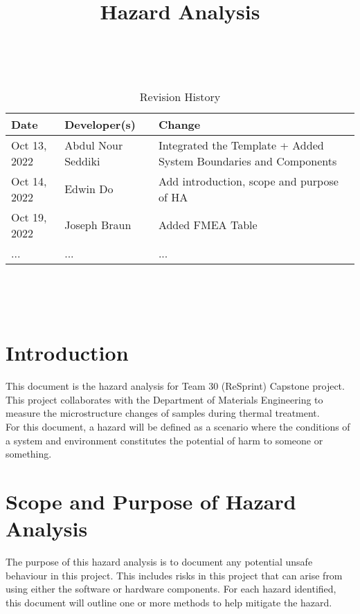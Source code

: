 \documentclass{article}
\title{Hazard Analysis\\\progname}
\author{\authname}
\date{}
\begin{document}
\maketitle
\thispagestyle{empty}

~\newpage


\begin{table}[hp]
\caption{Revision History} \label{TblRevisionHistory}
\begin{tabularx}{\textwidth}{llX}
\toprule
\textbf{Date} & \textbf{Developer(s)} & \textbf{Change}\\
\midrule
Oct 13, 2022 & Abdul Nour Seddiki & Integrated the Template + Added System Boundaries and Components\\
Oct 14, 2022 & Edwin Do & Add introduction, scope and purpose of HA \\
Oct 19, 2022 & Joseph Braun & Added FMEA Table\\
... & ... & ...\\
\bottomrule
\end{tabularx}
\end{table}

~\newpage

\tableofcontents

~\newpage



\section{Introduction}
This document is the hazard analysis for Team 30 (ReSprint) Capstone project. 
This project collaborates with the Department of Materials Engineering to measure the microstructure changes of samples during thermal treatment.\\

\noindent For this document, a hazard will be defined as 
a scenario where the conditions of a system and environment constitutes the potential of harm to someone or something.

\section{Scope and Purpose of Hazard Analysis}
The purpose of this hazard analysis is to document any potential unsafe behaviour in this project. 
This includes risks in this project that can arise from using either the software or hardware components.
For each hazard identified, this document will outline one or more methods to help mitigate the hazard.\\
\end{document}
